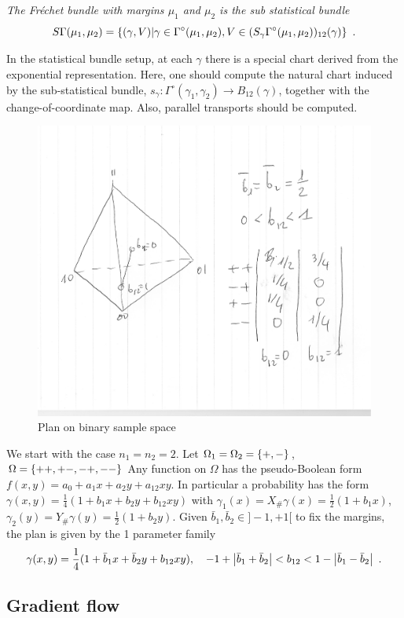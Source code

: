 \documentclass[runningheads]{llncs}
\begin{document}
%
\emph{The \emph{Fr\'echet bundle} with margins $\mu_1$ and $\mu_2$ is the sub statistical bundle
%
\begin{equation*}
  S\Gamma(\mu_1,\mu_2) = \left\{ (\gamma,V) \middle| \gamma\in\Gamma^\circ(\mu_1,\mu_2),V \in (S_\gamma\Gamma^\circ(\mu_1,\mu_2))_{12}(\gamma) \right\} \ .
\end{equation*}}

\begin{remark}
In the statistical bundle setup, at each $\gamma$ there is a special chart derived from the exponential representation. Here, one should compute the natural chart induced by the sub-statistical bundle, $s_\gamma \colon \Gamma^\circ(\gamma_1,\gamma_2) \to B_{12}(\gamma)$, together with the change-of-coordinate map. Also, parallel transports should be computed.
\end{remark}

\begin{exercise} 
%
  \begin{figure}[t]
    \centering
    \includegraphics[width=.4\textwidth]{plan2x2.pdf}
    \caption{Plan on binary sample space}
    \label{fig:1}
  \end{figure}
%
We start with the case $n_1=n_2=2$. Let $\Omega_1=\Omega_2=\left\{ +,- \right\}$, $\Omega=\left\{ ++,+-,-+,-- \right\}$ Any function on $\Omega$ has the pseudo-Boolean form $f(x,y)=a_0+a_1 x + a_2 y + a_{12} xy$. In particular a probability has the form $\gamma(x,y) = \frac14(1+b_1x+b_2y+b_{12}xy)$ with $\gamma_1(x) = X_{\#}\gamma (x)= \frac12(1+b_1x)$, $\gamma_2(y) = Y_\# \gamma(y) = \frac12(1+b_2y)$. Given $\bar b_1, \bar b_2 \in ]-1,+1[$ to fix the margins, the plan is given by the 1 parameter family 
%
  \begin{equation*}
    \gamma(x,y) = \frac14(1+\bar b_1x+\bar b_2y+b_{12}xy), \quad -1 + \left| \bar b_1+\bar b_2 \right| < b_{12} < 1 - \left| \bar b_1 - \bar b_2 \right| \ .
  \end{equation*}
\end{exercise}

\subsection{Gradient flow}
\end{document}
